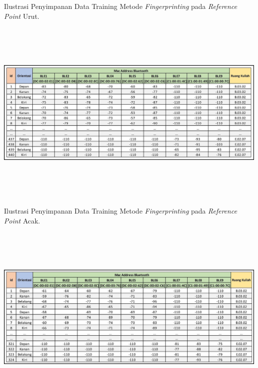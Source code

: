 \begin{enumerate}[a.]
\begin{landscape}
\begin{table}[H]
\caption{Ilustrasi Penyimpanan Data Training Metode \textit{Fingerprinting} pada \textit{Reference Point} Urut.}
\centering
\includegraphics[width=20cm, height=9cm]{gambar/pengumpulan_data/sequence_point.jpg}
\label{fingerprinting-sequence-point}
\end{table}
\end{landscape}

\begin{landscape}
\begin{table}[H]
\caption{Ilustrasi Penyimpanan Data Training Metode \textit{Fingerprinting} pada \textit{Reference Point} Acak.}
\centering
\includegraphics[width=20cm, height=9cm]{gambar/pengumpulan_data/random_point.jpg}
\label{fingerprinting-random-point}
\end{table}
\end{landscape}


\end{enumerate}
